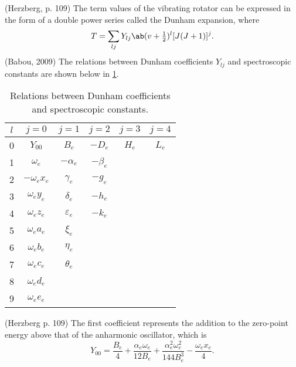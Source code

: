 \documentclass[11pt, twoside, fleqn]{report}
\begin{document}
    (Herzberg, p. 109)
    The term values of the vibrating rotator can be expressed in the form of a double power series called the Dunham expansion, where
    \begin{equation*}
        T = \sum_{lj}Y_{lj}\ab(v + \tfrac{1}{2})^{l} [J(J + 1)]^{j}.
    \end{equation*}
    (Babou, 2009)
    The relations between Dunham coefficients $Y_{lj}$ and spectroscopic constants are shown below in \cref{t:dunham_coefficients}.
    \begin{table}[H]
        \centering
        \caption{Relations between Dunham coefficients and spectroscopic constants.}
        \label{t:dunham_coefficients}
        \begin{tabular}{c|ccccc}
            \toprule
            $l$ & $j = 0$            & $j = 1$           & $j = 2$      & $j = 3$ & $j = 4$ \\
            \midrule
            0   & $Y_{00}$           & $B_{e}$           & $-D_{e}$     & $H_{e}$ & $L_{e}$ \\
            1   & $\omega_{e}$       & $-\alpha_{e}$     & $-\beta_{e}$ &         &         \\
            2   & $-\omega_{e}x_{e}$ & $\gamma_{e}$      & $-g_{e}$     &         &         \\
            3   & $\omega_{e}y_{e}$  & $\delta_{e}$      & $-h_{e}$     &         &         \\
            4   & $\omega_{e}z_{e}$  & $\varepsilon_{e}$ & $-k_{e}$     &         &         \\
            5   & $\omega_{e}a_{e}$  & $\xi_{e}$         &              &         &         \\
            6   & $\omega_{e}b_{e}$  & $\eta_{e}$        &              &         &         \\
            7   & $\omega_{e}c_{e}$  & $\theta_{e}$      &              &         &         \\
            8   & $\omega_{e}d_{e}$  &                   &              &         &         \\
            9   & $\omega_{e}e_{e}$  &                   &              &         &         \\
            \bottomrule
        \end{tabular}
    \end{table}
    (Herzberg p. 109)
    The first coefficient represents the addition to the zero-point energy above that of the anharmonic oscillator, which is
    \begin{equation*}
        Y_{00} = \frac{B_{e}}{4} + \frac{\alpha_{e}\omega_{e}}{12B_{e}} + \frac{\alpha_{e}^{2}\omega_{e}^{2}}{144B_{e}^{3}} - \frac{\omega_{e}x_{e}}{4}.
    \end{equation*}
\end{document}
